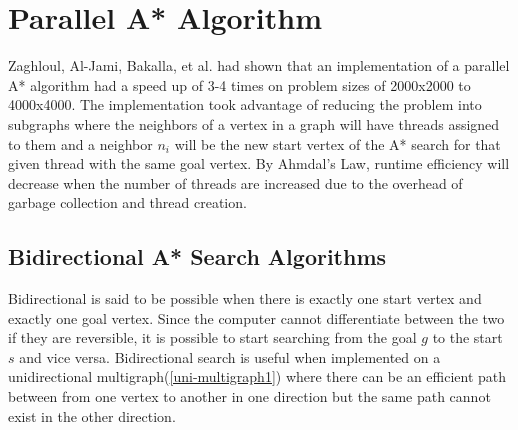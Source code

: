 

\section{Parallel A* Algorithm}
Zaghloul, Al-Jami, Bakalla, et al. had shown that an implementation of a parallel A* algorithm 
had a speed up of 3-4 times on problem sizes of 2000x2000 to 4000x4000.\cite{ZaghloulAlJami2017}
The implementation took advantage of reducing the problem into subgraphs where the neighbors of a
vertex in a graph will have threads assigned to them and a neighbor $n_i$ will be the new start 
vertex of the A* search for that given thread with the same goal vertex. By Ahmdal's Law, 
runtime efficiency will decrease when the number of threads are increased due to the overhead 
of garbage collection and thread creation. 

\subsection{Bidirectional A* Search Algorithms}
Bidirectional is said to be possible when there is exactly one start vertex and exactly one goal vertex.
Since the computer cannot differentiate between the two if they are reversible, it is possible to start 
searching from the goal $g$ to the start $s$ and vice versa.\cite{KainlKainz1997} Bidirectional search 
is useful when implemented on a unidirectional multigraph(\ref{uni-multigraph1})
where there can be an efficient path between from 
one vertex to another in one direction but the same path cannot exist in the other direction.

